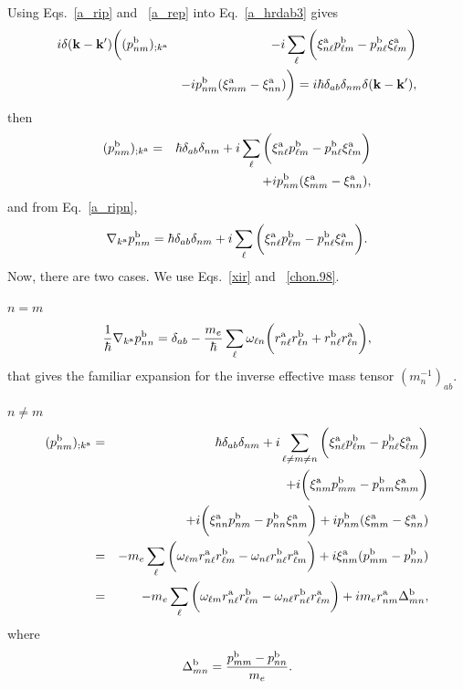 \documentclass[floatfix,prb,aps,superscriptaddress,11pt,preprint]{revtex4}
\begin{document}
Using Eqs.~\eqref{a_rip} and ~\eqref{a_rep}
into Eq.~\eqref{a_hrdab3} gives
\begin{eqnarray}\label{a_rapb}
i\delta(\mathbf{k}-\mathbf{k}')
\bigg(
(p^{\mathrm{b}}_{nm})_{;k^{\mathrm{a}}}
&&
-i
\sum_{\ell}
\bigg(
\xi^{\mathrm{a}}_{n\ell}
p^{\mathrm{b}}_{\ell m}
-
p^{\mathrm{b}}_{n\ell}
\xi^{\mathrm{a}}_{\ell m}
\bigg)
\nonumber \\
&&
-i
p^{\mathrm{b}}_{nm}(\xi^{\mathrm{a}}_{mm}
-
\xi^{\mathrm{a}}_{nn}
)
\bigg)
=
i\hbar\delta_{ab}\delta_{nm}\delta(\mathbf{k}-\mathbf{k}')
,
\end{eqnarray}
then
\begin{eqnarray}\label{a_rapb2}
(p^{\mathrm{b}}_{nm})_{;k^{\mathrm{a}}}&=&
\hbar\delta_{ab}\delta_{nm}
+i
\sum_{\ell}
\bigg(
\xi^{\mathrm{a}}_{n\ell}
p^{\mathrm{b}}_{\ell m}
-
p^{\mathrm{b}}_{n\ell}
\xi^{\mathrm{a}}_{\ell m}
\bigg)
\nonumber \\
&&+i
p^{\mathrm{b}}_{nm}(\xi^{\mathrm{a}}_{mm}
-
\xi^{\mathrm{a}}_{nn}
)
,
\end{eqnarray}
and from Eq.~\eqref{a_ripn},
\begin{eqnarray}\label{cogno}
\nabla_{k^{\mathrm{a}}}p^{\mathrm{b}}_{nm}=
\hbar\delta_{ab}\delta_{nm}
+i
\sum_{\ell}
\bigg(
\xi^{\mathrm{a}}_{n\ell}
p^{\mathrm{b}}_{\ell m}
-
p^{\mathrm{b}}_{n\ell}
\xi^{\mathrm{a}}_{\ell m}
\bigg)
.
\end{eqnarray}
Now, there are two cases. We use Eqs.~\eqref{xir} and ~\eqref{chon.98}.

 $n=m$
\begin{eqnarray}\label{tita}
\frac{1}{\hbar}\nabla_{k^{\mathrm{a}}}p^{\mathrm{b}}_{nn}=
\delta_{ab}
-\frac{m_e}{\hbar}
\sum_{\ell}
\omega_{\ell n}
\bigg(
r^{\mathrm{a}}_{n\ell}
r^{\mathrm{b}}_{\ell n}
+
r^{\mathrm{b}}_{n\ell}
r^{\mathrm{a}}_{\ell n}
\bigg)
,
\end{eqnarray}
that gives the familiar expansion for the inverse effective mass
tensor $(m_n^{-1})_{ab}$.\cite{aschcroft}

 $n\ne m$
\begin{eqnarray}\label{mes}
(p^{\mathrm{b}}_{nm})_{;k^{\mathrm{a}}}&=&
\hbar\delta_{ab}\delta_{nm}
+i
\sum_{\ell\ne m\ne n}
\bigg(
\xi^{\mathrm{a}}_{n\ell}
p^{\mathrm{b}}_{\ell m}
-
p^{\mathrm{b}}_{n\ell}
\xi^{\mathrm{a}}_{\ell m}
\bigg)
\nonumber\\
&&+
i
\bigg(
\xi^{\mathrm{a}}_{nm}
p^{\mathrm{b}}_{mm}
-
p^{\mathrm{b}}_{nm}
\xi^{\mathrm{a}}_{mm}
\bigg)
\nonumber\\
&&+
i
\bigg(
\xi^{\mathrm{a}}_{nn}
p^{\mathrm{b}}_{nm}
-
p^{\mathrm{b}}_{nn}
\xi^{\mathrm{a}}_{nm}
\bigg)
+i
p^{\mathrm{b}}_{nm}(\xi^{\mathrm{a}}_{mm}
-
\xi^{\mathrm{a}}_{nn}
)
\nonumber \\
&=&
-m_e
\sum_{\ell}
\bigg(
\omega_{\ell m}
r^{\mathrm{a}}_{n\ell}
r^{\mathrm{b}}_{\ell m}
-
\omega_{n\ell}
r^{\mathrm{b}}_{n\ell}
r^{\mathrm{a}}_{\ell m}
\bigg)
+i
\xi^{\mathrm{a}}_{nm}
(p^{\mathrm{b}}_{mm}
-
p^{\mathrm{b}}_{nn}
)
\nonumber \\
&=&
-m_e
\sum_{\ell}
\bigg(
\omega_{\ell m} 
r^{\mathrm{a}}_{n\ell} 
r^{\mathrm{b}}_{\ell m}
-
\omega_{n\ell} 
r^{\mathrm{b}}_{n\ell} 
r^{\mathrm{a}}_{\ell m}
\bigg)
+i 
m_er^{\mathrm{a}}_{nm}
\Delta^{\mathrm{b}}_{mn}
,
\end{eqnarray} 
where
\begin{equation}\label{a_delta}
\Delta^{\mathrm{b}}_{mn}=\frac{p^{\mathrm{b}}_{mm}-p^{\mathrm{b}}_{nn}}{m_e}
.
\end{equation}
\end{document}
